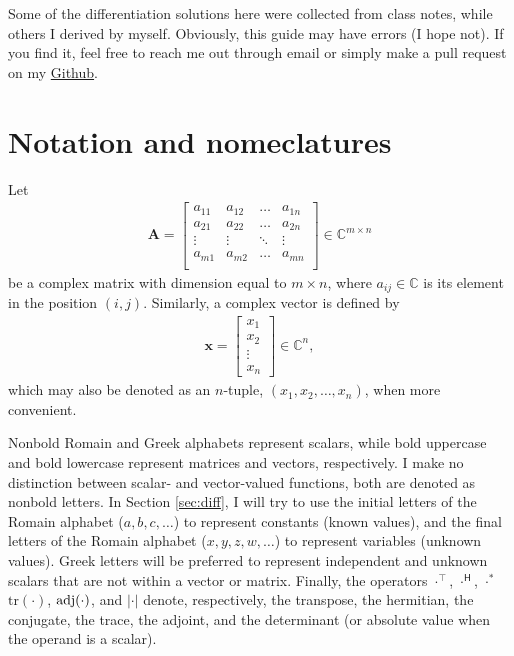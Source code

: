 \documentclass{article}
\newcommand{\trans}{\top}
\newcommand{\hermit}{\mathsf{H}}
\newcommand\abs[1]{\left\lvert#1\right\rvert}
\begin{document}
Some of the differentiation solutions here were collected from class notes, while others I derived by myself. Obviously, this guide may have errors (I hope not). If you find it, feel free to reach me out through email or simply make a pull request on my \href{https://github.com/tapyu/courses/tree/main/matrix_diff_ref}{Github}.

\section{Notation and nomeclatures}

Let
\begin{align}
    \mathbf{A} = \begin{bmatrix}
        a_{11} & a_{12} & \dots & a_{1n} \\
        a_{21} & a_{22} & \dots & a_{2n} \\
        \vdots & \vdots & \ddots & \vdots \\
        a_{m1} & a_{m2} & \dots & a_{mn} \\
    \end{bmatrix} \in \mathbb{C}^{m \times n}
\end{align}
be a complex matrix with dimension equal to \(m \times n\), where \(a_{ij} \in \mathbb{C}\) is its element in the position \((i,j)\). Similarly, a complex vector is defined by
\begin{align}
    \mathbf{x} = \begin{bmatrix}
        x_1 \\
        x_2 \\
        \vdots \\
        x_n
    \end{bmatrix}  \in \mathbb{C}^{n},
\end{align}
which may also be denoted as an \(n\)-tuple, \((x_1, x_2, \dots, x_n)\), when more convenient.

Nonbold Romain and Greek alphabets represent scalars, while bold uppercase and bold lowercase represent matrices and vectors, respectively. I make no distinction between scalar- and vector-valued functions, both are denoted as nonbold letters. In Section \ref{sec:diff}, I will try to use the initial letters of the Romain alphabet (\(a, b, c, \dots\)) to represent constants (known values), and the final letters of the Romain alphabet (\(x, y, z, w, \dots\)) to represent variables (unknown values). Greek letters will be preferred to represent independent and unknown scalars that are not within a vector or matrix. Finally, the operators \(\cdot^{\trans}\), \(\cdot^{\hermit}\), \(\cdot^*\) \(\text{tr}(\cdot)\), \(\textnormal{adj}(\cdot)\), and \(\abs{\cdot}\) denote, respectively, the transpose, the hermitian, the conjugate, the trace, the adjoint, and the determinant (or absolute value when the operand is a scalar).
\end{document}
